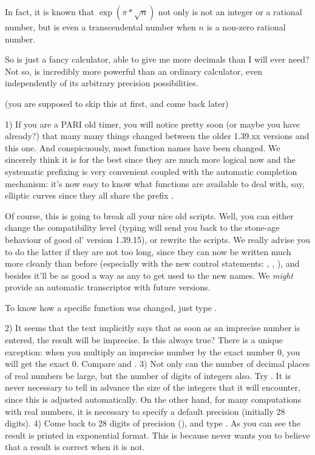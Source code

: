 In fact, it is known that $\exp(\pi*\sqrt{n})$ not only is not an integer
or a rational number, but is even a transcendental number when $n$ is a
non-zero rational number.

So  is just a fancy calculator, able to give me more decimals than I will
ever need? Not so,  is incredibly more powerful than an ordinary
calculator, even independently of its arbitrary precision possibilities.

 (you are supposed to skip this at first,
and come back later)

1) If you are a PARI old timer, you will notice pretty soon (or maybe you
have already?) that many many things changed between the older 1.39.xx
versions and this one. And conspicuously, most function names have been
changed. We sincerely think it is for the best since they are much more
logical now and the systematic prefixing is very convenient coupled with the
automatic completion mechanism: it's now easy to know what functions are
available to deal with, say, elliptic curves since they all share the prefix
.

Of course, this is going to break all your nice old scripts. Well, you can
either change the compatibility level (typing 
will send you back to the stone-age behaviour of good ol' version 1.39.15),
or rewrite the scripts. We really advise you to do the latter if they are not
too long, since they can now be written much more cleanly than before
(especially with the new control statements: , ,
), and besides it'll be as good a way as any to get used to the new
names. We {\it might} provide an automatic transcriptor with future versions.

To know how a specific function was changed, just type
.

2) It seems that the text implicitly says that as soon as an imprecise number
is entered, the result will be imprecise. Is this always true? There is a
unique exception: when you multiply an imprecise number by the exact number 0,
you will get the exact 0. Compare  and . \smallskip
%
3) Not only can the number of decimal places of real numbers be large, but the
number of digits of integers also. Try . It is never necessary to
tell  in advance the size of the integers that it will encounter, since this
is adjusted automatically. On the other hand, for many computations with real
numbers, it is necessary to specify a default precision (initially 28 digits).
\smallskip
%
4) Come back to 28 digits of precision (), and type
. As you can see the result is printed in exponential format.
This is because  never wants you to believe that a result is correct when it
is not.

